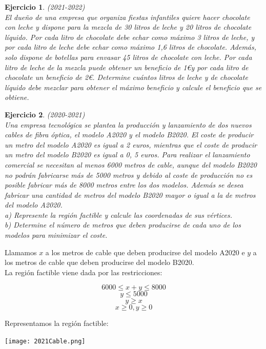 \documentclass[12pt, a4paper]{amsart}
\newtheorem{ejer}{Ejercicio}
\newcommand{\s}{\color[rgb]{0,0,0.5}}
\begin{document}
\begin{ejer}\em (2021-2022)\\
El dueño de una empresa que organiza fiestas infantiles quiere hacer chocolate con leche y dispone para la mezcla de 30 litros de leche y 20 litros de chocolate líquido. Por cada litro de chocolate
debe echar como máximo 3 litros de leche, y por cada litro de leche debe echar como máximo 1,6 litros de chocolate. Además, solo dispone de botellas para envasar 45 litros de chocolate con leche. Por cada litro de leche de la mezcla puede obtener un beneficio de 1\euro y por cada litro de chocolate un beneficio de 2\euro. Determine cuántos litros de leche y de chocolate líquido debe mezclar para obtener el máximo beneficio y calcule el beneficio que se obtiene.
\end{ejer}

\begin{ejer}\em (2020-2021)\\
Una empresa tecnológica se plantea la producción y lanzamiento de dos nuevos cables de fibra óptica, el modelo A2020 y el modelo B2020. El coste de producir un metro del modelo A2020 es igual a 2 euros, mientras que el coste de producir un metro del modelo B2020 es igual a 0, 5 euros. Para realizar el lanzamiento comercial se necesitan al menos 6000 metros de cable, aunque del modelo B2020 no podrán fabricarse más de 5000 metros y debido al coste de producción no es posible fabricar más de 8000 metros entre los dos modelos. Además se desea fabricar una cantidad de metros del modelo B2020 mayor o igual a la de metros del modelo A2020.\\
a) Represente la región factible y calcule las coordenadas de sus vértices.\\
b) Determine el número de metros que deben producirse de cada uno de los modelos para minimizar el coste.
\end{ejer}

\newpage


\s
Llamamos $x$ a los metros de cable que deben producirse del modelo A2020 e $y$ a los metros de cable que deben producirse del modelo B2020.\\

La región factible viene dada por las restricciones:

\[6000\leqslant x+y \leqslant 8000\]
\[y\leqslant 5000\]
\[y\geqslant x\]
\[x\geqslant 0, y\geqslant 0\]

Representamos la región factible:
\begin{center}
\texttt{[image: 2021Cable.png]}
\end{center}
\end{document}
